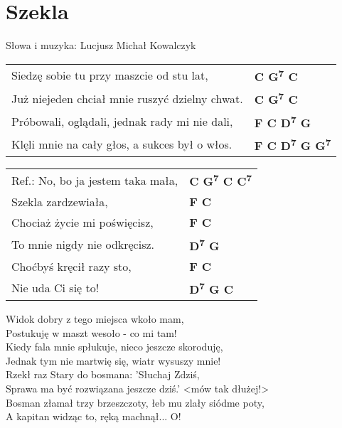 \section{Szekla}

Słowa i muzyka: Lucjusz Michał Kowalczyk \\

\vspace{2em}
\begin{tabular}{@{}p{9cm}@{}l@{}}
Siedzę sobie tu przy maszcie od stu lat, & \bfseries  C G\textsuperscript{7} C \\
Już niejeden chciał mnie ruszyć dzielny chwat. & \bfseries  C G\textsuperscript{7} C \\
Próbowali, oglądali, jednak rady mi nie dali, & \bfseries  F C D\textsuperscript{7} G \\
Klęli mnie na cały głos, a sukces był o włos. & \bfseries F C D\textsuperscript{7} G G\textsuperscript{7} \\
\end{tabular}

\vspace{1em}
\begin{tabular}{@{}p{9cm}@{}l@{}}
Ref.: No, bo ja jestem taka mała, & \bfseries  C G\textsuperscript{7} C C\textsuperscript{7} \\
Szekla zardzewiała, & \bfseries  F C \\
Chociaż życie mi poświęcisz, & \bfseries F C \\
To mnie nigdy nie odkręcisz. & \bfseries  D\textsuperscript{7} G \\
Choćbyś kręcił razy sto, & \bfseries  F C \\
Nie uda Ci się to! & \bfseries  D\textsuperscript{7} G C \\
\end{tabular}

\vspace{1em}
Widok dobry z tego miejsca wkoło mam, \\
Postukuję w maszt wesoło - co mi tam! \\
Kiedy fala mnie spłukuje, nieco jeszcze skoroduję, \\
Jednak tym nie martwię się, wiatr wysuszy mnie! \\

Rzekł raz Stary do bosmana: 'Słuchaj Zdziś, \\
Sprawa ma być rozwiązana jeszcze dziś.'  <mów tak dłużej!> \\
Bosman złamał trzy brzeszczoty, łeb mu zlały siódme poty, \\
A kapitan widząc to, ręką machnął... O! \\

